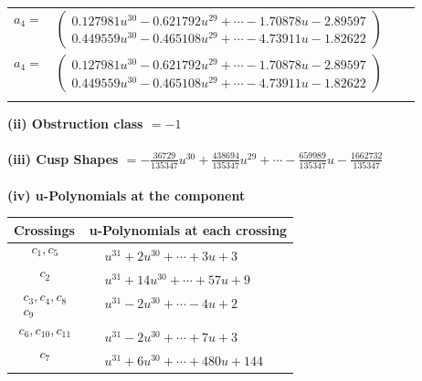 \documentclass[1p]{elsarticle_modified}
\theoremstyle{definition}
\begin{document}
\begin{tabular}{m{7pt} m{180pt} m{7pt} m{180pt} }
\flushright $a_{4}=$&$\begin{pmatrix}0.127981 u^{30}-0.621792 u^{29}+\cdots-1.70878 u-2.89597\\0.449559 u^{30}-0.465108 u^{29}+\cdots-4.73911 u-1.82622\end{pmatrix}$\\ \flushright $a_{4}=$&$\begin{pmatrix}0.127981 u^{30}-0.621792 u^{29}+\cdots-1.70878 u-2.89597\\0.449559 u^{30}-0.465108 u^{29}+\cdots-4.73911 u-1.82622\end{pmatrix}$\\&\end{tabular}
\flushleft \textbf{(ii) Obstruction class $= -1$}\\~\\
\flushleft \textbf{(iii) Cusp Shapes $= -\frac{36729}{135347} u^{30}+\frac{438694}{135347} u^{29}+\cdots-\frac{659989}{135347} u-\frac{1662732}{135347}$}\\~\\
\newpage\renewcommand{\arraystretch}{1}
\flushleft \textbf{(iv) u-Polynomials at the component}\newline \\
\begin{tabular}{m{50pt}|m{274pt}}
Crossings & \hspace{64pt}u-Polynomials at each crossing \\
\hline $$\begin{aligned}c_{1},c_{5}\end{aligned}$$&$\begin{aligned}
&u^{31}+2 u^{30}+\cdots+3 u+3
\end{aligned}$\\
\hline $$\begin{aligned}c_{2}\end{aligned}$$&$\begin{aligned}
&u^{31}+14 u^{30}+\cdots+57 u+9
\end{aligned}$\\
\hline $$\begin{aligned}c_{3},c_{4},c_{8}\\c_{9}\end{aligned}$$&$\begin{aligned}
&u^{31}-2 u^{30}+\cdots-4 u+2
\end{aligned}$\\
\hline $$\begin{aligned}c_{6},c_{10},c_{11}\end{aligned}$$&$\begin{aligned}
&u^{31}-2 u^{30}+\cdots+7 u+3
\end{aligned}$\\
\hline $$\begin{aligned}c_{7}\end{aligned}$$&$\begin{aligned}
&u^{31}+6 u^{30}+\cdots+480 u+144
\end{aligned}$\\
\hline
\end{tabular}\\~\\
\end{document}
